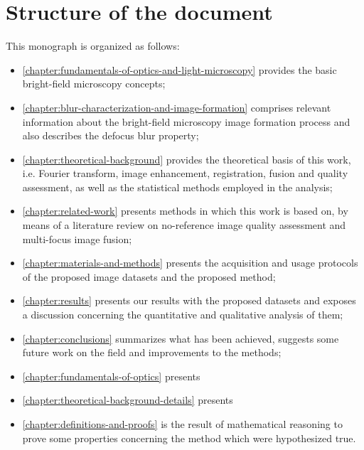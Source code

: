 \section*{Structure of the document}

This monograph is organized as follows:

\begin{itemize}
    \item \autoref{chapter:fundamentals-of-optics-and-light-microscopy} provides the basic bright-field microscopy concepts;
    
    \item \autoref{chapter:blur-characterization-and-image-formation} comprises relevant information about the bright-field microscopy image formation process and also describes the defocus blur property;
    
    \item \autoref{chapter:theoretical-background} provides the theoretical basis of this work, i.e. Fourier transform, image enhancement, registration, fusion and quality assessment, as well as the statistical methods employed in the analysis;
    
    \item \autoref{chapter:related-work} presents methods in which this work is based on, by means of a literature review on no-reference image quality assessment and multi-focus image fusion;
    
    \item \autoref{chapter:materials-and-methods} presents the acquisition and usage protocols of the proposed image datasets and the proposed method;
    
    \item \autoref{chapter:results} presents our results with the proposed datasets and exposes a discussion concerning the quantitative and qualitative analysis of them;
    
    \item \autoref{chapter:conclusions} summarizes what has been achieved, suggests some future work on the field and improvements to the methods;
    
    \item
    \autoref{chapter:fundamentals-of-optics} presents
    
    \item
    \autoref{chapter:theoretical-background-details} presents
    
    \item \autoref{chapter:definitions-and-proofs} is the result of mathematical reasoning to prove some properties concerning the method which were hypothesized true.
    
\end{itemize}